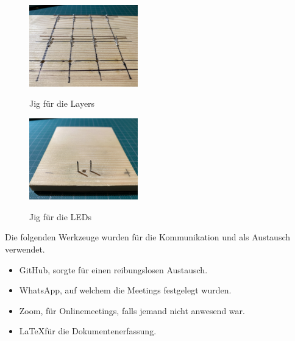 \documentclass{article}
\begin{document}
\begin{figure}[!h]
\begin{center}
\includegraphics[width=0.42\textwidth]{bilder/jig2.jpeg}
\caption{Jig für die Layers}
\label{fig:jig2}
\includegraphics[width=0.42\textwidth]{bilder/jig1.jpeg}
\caption{Jig für die LEDs}
\label{fig:jig1}
\end{center}
\end{figure}

\noindent Die folgenden Werkzeuge wurden für die Kommunikation und als Austausch verwendet.
\begin{itemize}
\item GitHub, sorgte für einen reibungslosen Austausch.
\item WhatsApp, auf welchem die Meetings festgelegt wurden.
\item Zoom, für Onlinemeetings, falls jemand nicht anwesend war.
\item \LaTeX \text{ }für die Dokumentenerfassung.
\end{itemize} 
\end{document}
